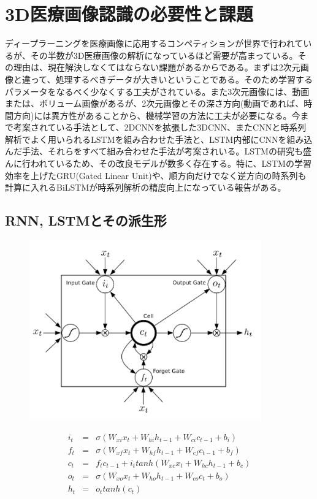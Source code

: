 \documentclass[a4j,10pt,oneside,openany]{jsbook}
\begin{document}
\section{3D医療画像認識の必要性と課題}
ディープラーニングを医療画像に応用するコンペティションが世界で行われているが、その半数が3D医療画像の解析になっているほど需要が高まっている。その理由は、現在解決しなくてはならない課題があるからである。まずは2次元画像と違って、処理するべきデータが大きいということである。そのため学習するパラメータをなるべく少なくする工夫がされている。また3次元画像には、動画または、ボリューム画像があるが、2次元画像とその深さ方向(動画であれば、時間方向)には異方性があることから、機械学習の方法に工夫が必要になる。今まで考案されている手法として、2DCNNを拡張した3DCNN、またCNNと時系列解析でよく用いられるLSTMを組み合わせた手法と、LSTM内部にCNNを組み込んだ手法、それらをすべて組み合わせた手法が考案されいる。LSTMの研究も盛んに行われているため、その改良モデルが数多く存在する。特に、LSTMの学習効率を上げたGRU(Gated Linear Unit)や、順方向だけでなく逆方向の時系列も計算に入れるBiLSTMが時系列解析の精度向上になっている報告がある。
\subsection{RNN, LSTMとその派生形}
\begin{figure}[h]
\includegraphics[width=10cm]{img/lstm.png}
\end{figure}

\begin{eqnarray}
  i_t & = & \sigma(W_{xi} x_t + W_{hi} h_{t-1} + W_{ci} c_{t-1} + b_i) \\
  f_t & = & \sigma(W_{xf} x_t + W_{hf} h_{t-1} + W_{cf} c_{t-1} + b_f ) \\
  c_t & = & f_t c_{t-1} + i_t tanh(W_{xc} x_t + W_{hc} h_{t-1} + b_c) \\
  o_t & = & \sigma(W_{xo} x_t + W_{ho} h_{t-1} + W_{co} c_t + b_o) \\
  h_t & = & o_t tanh(c_t) 
\end{eqnarray}
\end{document}
